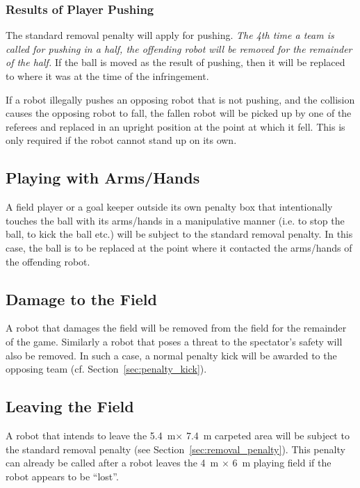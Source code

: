\documentclass[12pt]{article}
\newcommand{\cf}{\mbox{cf.}\xspace}
\newcommand{\TotalWidth}{5.4~m\xspace}
\newcommand{\TotalLength}{7.4~m\xspace }
\begin{document}
\subsubsection{Results of Player Pushing}
\label{sec:pushing_results}

The standard removal penalty will apply for pushing. \emph{The 4th time a team is called for pushing in a half, the offending robot will be removed for the remainder of the half.} If the ball is moved as the result of pushing, then it will be replaced to where it was at the time of the infringement.

If a robot illegally pushes an opposing robot that is not pushing, and the collision causes the opposing robot to fall, the fallen robot will be picked up by one of the referees and replaced in an upright position at the point at which it fell. This is only required if the robot cannot stand up on its own.

\subsection{Playing with Arms/Hands}
\label{sec:hand_ball}

A field player or a goal keeper outside its own penalty box that intentionally touches the ball with its arms/hands in a manipulative manner (i.e. to stop the ball, to kick the ball etc.) will be subject to the standard removal penalty. In this case, the ball is to be replaced at the point where it contacted the arms/hands of the offending robot.

\subsection{Damage to the Field}

A robot that damages the field will be removed from the field for the remainder of the game. Similarly a robot that poses a threat to the spectator's safety will also be removed. In such a case, a normal penalty kick will be awarded to the opposing team (\cf Section~\ref{sec:penalty_kick}).

\subsection{Leaving the Field}
\label{sec:leaving_field}

A robot that intends to leave the \TotalWidth $\times$ \TotalLength carpeted area will be subject to the standard removal penalty (see
Section~\ref{sec:removal_penalty}). This penalty can already be called after a robot leaves the 4~m $\times$ 6~m playing field if the robot appears to be ``lost''.
\end{document}
